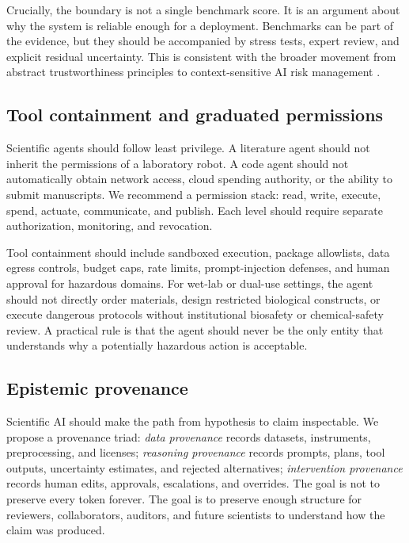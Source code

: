 \documentclass{article}
\begin{document}
Crucially, the boundary is not a single benchmark score. It is an argument about why the system is reliable enough for a deployment. Benchmarks can be part of the evidence, but they should be accompanied by stress tests, expert review, and explicit residual uncertainty. This is consistent with the broader movement from abstract trustworthiness principles to context-sensitive AI risk management \citep{nist2023airmf,nist2024genai}.

\subsection{Tool containment and graduated permissions}

Scientific agents should follow least privilege. A literature agent should not inherit the permissions of a laboratory robot. A code agent should not automatically obtain network access, cloud spending authority, or the ability to submit manuscripts. We recommend a permission stack: read, write, execute, spend, actuate, communicate, and publish. Each level should require separate authorization, monitoring, and revocation.

Tool containment should include sandboxed execution, package allowlists, data egress controls, budget caps, rate limits, prompt-injection defenses, and human approval for hazardous domains. For wet-lab or dual-use settings, the agent should not directly order materials, design restricted biological constructs, or execute dangerous protocols without institutional biosafety or chemical-safety review. A practical rule is that the agent should never be the only entity that understands why a potentially hazardous action is acceptable.

\subsection{Epistemic provenance}

Scientific AI should make the path from hypothesis to claim inspectable. We propose a provenance triad: \emph{data provenance} records datasets, instruments, preprocessing, and licenses; \emph{reasoning provenance} records prompts, plans, tool outputs, uncertainty estimates, and rejected alternatives; \emph{intervention provenance} records human edits, approvals, escalations, and overrides. The goal is not to preserve every token forever. The goal is to preserve enough structure for reviewers, collaborators, auditors, and future scientists to understand how the claim was produced.
\end{document}
